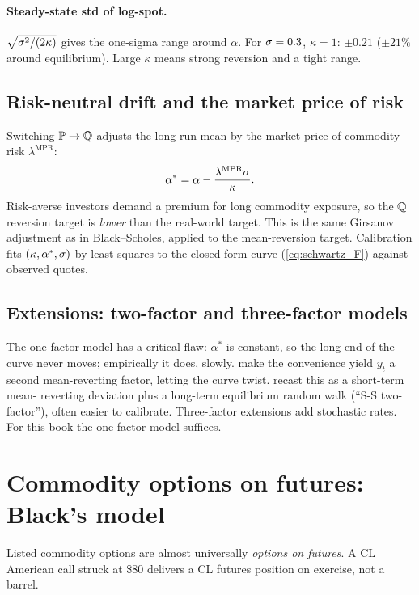 \paragraph{Steady-state std of log-spot.}
$\sqrt{\sigma^2/(2\kappa)}$ gives the one-sigma range around
$\alpha$.  For $\sigma = 0.3$, $\kappa = 1$: $\pm 0.21$ ($\pm 21\%$
around equilibrium).  Large $\kappa$ means strong reversion and a
tight range.

\subsection{Risk-neutral drift and the market price of risk}

Switching $\mathbb{P} \to \mathbb{Q}$ adjusts the long-run mean by the market
price of commodity risk $\lambda^{\mathrm{MPR}}$:
\[
  \alpha^* = \alpha - \frac{\lambda^{\mathrm{MPR}} \sigma}{\kappa}.
\]
Risk-averse investors demand a premium for long commodity exposure,
so the $\mathbb{Q}$ reversion target is \emph{lower} than the real-world
target.  This is the same Girsanov adjustment as in Black--Scholes,
applied to the mean-reversion target.  Calibration fits
$(\kappa, \alpha^*, \sigma)$ by least-squares to the closed-form
curve (\ref{eq:schwartz_F}) against observed quotes.

\subsection{Extensions: two-factor and three-factor models}

The one-factor model has a critical flaw: $\alpha^*$ is constant,
so the long end of the curve never moves; empirically it does,
slowly.  \citet{gibsonschwartz1990} make the convenience yield
$y_t$ a second mean-reverting factor, letting the curve twist.
\citet{schwartzsmith2000} recast this as a short-term mean-
reverting deviation plus a long-term equilibrium random walk (``S-S
two-factor''), often easier to calibrate.  Three-factor extensions
add stochastic rates.  For this book the one-factor model
suffices.
\citeSchwartz


\section{Commodity options on futures: Black's model}
\label{sec:black76_commodities}

Listed commodity options are almost universally \emph{options on
futures}.  A CL American call struck at \$80 delivers a CL futures
position on exercise, not a barrel.

